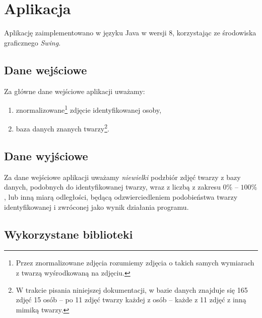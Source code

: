 \documentclass[a4paper,titlepage]{article}
\theoremstyle{break}
\numberwithin{equation}{subsection}
\begin{document}

\section{Aplikacja}
\label{sec:aplikacja}

Aplikację zaimplementowano w języku Java w wersji 8, korzystając ze środowiska graficznego \emph{Swing}.


\subsection{Dane wejściowe}

Za główne dane wejściowe aplikacji uważamy:
\begin{enumerate}
	\item znormalizowane\footnote{Przez znormalizowane zdjęcia rozumiemy zdjęcia o takich samych wymiarach z twarzą wyśrodkowaną na zdjęciu.} zdjęcie identyfikowanej osoby,
	\item baza danych znanych twarzy\footnote{W trakcie pisania niniejszej dokumentacji, w bazie danych znajduje się 165 zdjęć 15 osób -- po 11 zdjęć twarzy każdej z osób -- każde z 11 zdjęć z inną mimiką twarzy.}.
\end{enumerate}


\subsection{Dane wyjściowe}

Za dane wejściowe aplikacji uważamy \emph{niewielki} podzbiór zdjęć twarzy z bazy danych, podobnych do identyfikowanej twarzy, wraz z liczbą z zakresu $0\%$ -- $100\%$, lub inną miarą odległości, będącą odzwierciedleniem podobieństwa twarzy identyfikowanej i zwróconej jako wynik działania programu.


\subsection{Wykorzystane biblioteki}
\end{document}
